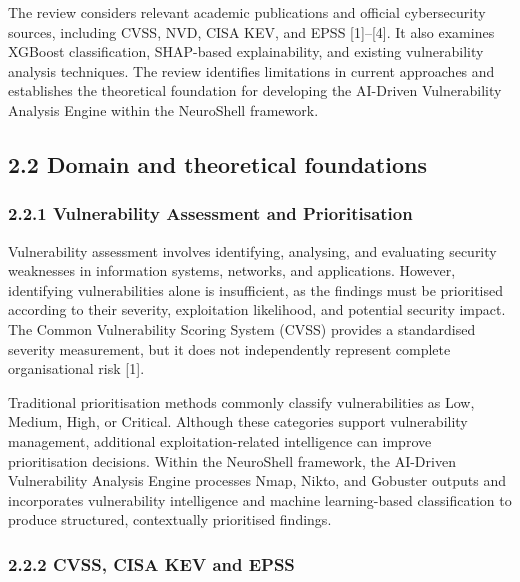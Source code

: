 \documentclass[
]{article}
\begin{document}
The review considers relevant academic publications and official
cybersecurity sources, including CVSS, NVD, CISA KEV, and EPSS
{[}1{]}--{[}4{]}. It also examines XGBoost classification, SHAP-based
explainability, and existing vulnerability analysis techniques. The
review identifies limitations in current approaches and establishes the
theoretical foundation for developing the AI-Driven Vulnerability
Analysis Engine within the NeuroShell framework.

\hypertarget{domain-and-theoretical-foundations}{%
\subsection{2.2 Domain and theoretical
foundations}\label{domain-and-theoretical-foundations}}

\hypertarget{vulnerability-assessment-and-prioritisation}{%
\subsubsection{2.2.1 Vulnerability Assessment and
Prioritisation}\label{vulnerability-assessment-and-prioritisation}}

Vulnerability assessment involves identifying, analysing, and evaluating
security weaknesses in information systems, networks, and applications.
However, identifying vulnerabilities alone is insufficient, as the
findings must be prioritised according to their severity, exploitation
likelihood, and potential security impact. The Common Vulnerability
Scoring System (CVSS) provides a standardised severity measurement, but
it does not independently represent complete organisational risk
{[}1{]}.

Traditional prioritisation methods commonly classify vulnerabilities as
Low, Medium, High, or Critical. Although these categories support
vulnerability management, additional exploitation-related intelligence
can improve prioritisation decisions. Within the NeuroShell framework,
the AI-Driven Vulnerability Analysis Engine processes Nmap, Nikto, and
Gobuster outputs and incorporates vulnerability intelligence and machine
learning-based classification to produce structured, contextually
prioritised findings.

\hypertarget{cvss-cisa-kev-and-epss}{%
\subsubsection{2.2.2 CVSS, CISA KEV and
EPSS}\label{cvss-cisa-kev-and-epss}}
\end{document}
